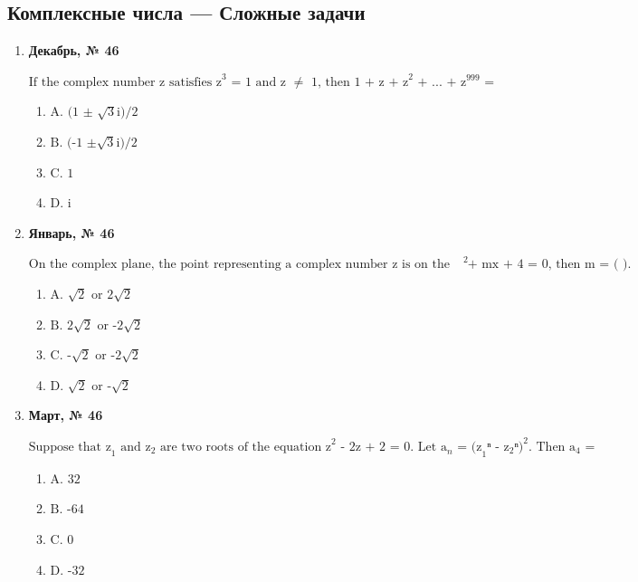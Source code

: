 \subsection*{Комплексные числа — Сложные задачи}
\begin{enumerate}
\item \textbf{Декабрь, № 46} \par \smallskip
$\displaystyle \text{If the complex number z satisfies z}^{3}\text{ = 1 and z }\neq\text{  1, then 1 + z + z}^{2}\text{ + ... + z}^{999}\text{ =}$
\begin{enumerate}
\item $\displaystyle \text{A. (1 ± }\sqrt{3}\text{i)/2}$
\item $\displaystyle \text{B. (-1 ±}\sqrt{3}\text{i)/2}$
\item $\displaystyle \text{C. 1}$
\item $\displaystyle \text{D. i}$
\end{enumerate}
\item \textbf{Январь, № 46} \par \smallskip
$\displaystyle \text{On the complex plane, the point representing a complex number z is on the straight line x - y = 0. If z is a root of a quadratic equation x}^{2}\text{ + mx + 4 = 0, then m = ( ).}$
\begin{enumerate}
\item $\displaystyle \text{A. }\sqrt{2}\text{  or 2}\sqrt{2}$
\item $\displaystyle \text{B. 2}\sqrt{2}\text{  or -2}\sqrt{2}$
\item $\displaystyle \text{C. -}\sqrt{2}\text{  or -2}\sqrt{2}$
\item $\displaystyle \text{D. }\sqrt{2}\text{  or -}\sqrt{2}$
\end{enumerate}
\item \textbf{Март, № 46} \par \smallskip
$\displaystyle \text{Suppose that z}_{1}\text{ and z}_{2}\text{ are two roots of the equation z}^{2}\text{ - 2z + 2 = 0. Let a}_{n}\text{ = (z}_{1}\text{ⁿ - z}_{2}\text{ⁿ)}^{2}\text{. Then a}_{4}\text{ =}$
\begin{enumerate}
\item $\displaystyle \text{A. 32}$
\item $\displaystyle \text{B. -64}$
\item $\displaystyle \text{C. 0}$
\item $\displaystyle \text{D. -32}$
\end{enumerate}
\end{enumerate}

